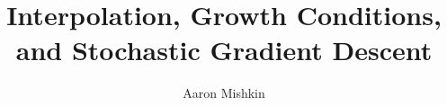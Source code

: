 \documentclass[gpscopy,onehalfspacing,11pt]{ubcdiss}
\title{Interpolation, Growth Conditions, and Stochastic Gradient Descent}
\author{Aaron Mishkin}
\begin{document}

\maketitle

\makecommitteepage

\listoftodos


\cleardoublepage


\cleardoublepage


\cleardoublepage

\tableofcontents
\cleardoublepage	%

\listoftables
\cleardoublepage	%

\listoffigures
\cleardoublepage	%



\textspacing		%




\mainmatter

\acresetall	%
\end{document}
